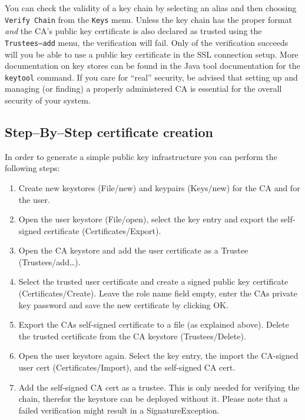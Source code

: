 You can  check the validity of a  key chain by selecting  an alias and
then choosing {\tt Verify Chain}  from the {\tt Keys} menu. Unless the
key  chain  has  the proper  format  {\em  and}  the CA's  public  key
certificate is also declared  as trusted using the {\tt Trustees--add}
menu, the  verification will fail.  Only of  the verification succeeds
will you be able to use a public key certificate in the SSL connection
setup. More documentation on key stores  can be found in the Java tool
documentation for the {\tt keytool}  command. If you care for ``real''
security,  be advised  that setting  up  and managing  (or finding)  a
properly administered CA is essential for the overall security of your
system.

\subsection{Step--By--Step certificate creation}
In  order to  generate  a  simple public  key  infrastructure you  can
perform the following steps:
\begin{enumerate}
\item Create new keystores (File/new) and keypairs (Keys/new) for the CA
and for the user.
\item  Open the  user keystore (File/open),  select the  key  entry and
export the self-signed certificate (Certificates/Export).
\item  Open  the  CA  keystore  and  add the  user  certificate  as  a
Trustee (Trustees/add\dots).
\item Select the  trusted user certificate and create  a signed public
key certificate (Certificates/Create). Leave the role name field empty,
enter the  CAs private  key password and  save the new  certificate by
clicking OK.
\item Export the  CAs self-signed certificate to a  file (as explained
above).    Delete    the    trusted    certificate   from    the    CA
keystore (Trustees/Delete).
\item Open the  user keystore again. Select the  key entry, the import
the CA-signed  user cert (Certificates/Import), and  the self-signed CA
cert.
\item Add  the self-signed CA cert  as a trustee. This  is only needed
for verifying the chain, therefor the keystore can be deployed without
it.  Please  note  that  a  failed  verification  might  result  in  a
SignatureException.
\end{enumerate}

